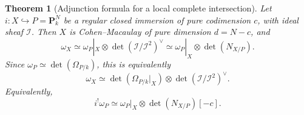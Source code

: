 \documentclass[11pt,a4paper]{article}
\newtheorem{theorem}{Theorem}[section]
\theoremstyle{definition}
\theoremstyle{remark}
\newcommand{\II}{\mathcal I}
\newcommand{\PP}{\mathbf P}
\newcommand{\dual}{^{\vee}}
\newcommand{\determinant}{\operatorname{det}}
\begin{document}
\begin{theorem}[Adjunction formula for a local complete intersection]
\label{thm:lci-adjunction}
Let $i:X\hookrightarrow P=\PP^N_k$ be a regular closed immersion of pure
codimension $c$, with ideal sheaf $\II$. Then $X$ is Cohen--Macaulay of pure
dimension $d=N-c$, and
\begin{equation}\label{eq:lci-adjunction}
  \omega_X
  \simeq
  \omega_P|_X\otimes
  \determinant(\II/\II^2)\dual
  \simeq\omega_P|_X\otimes\determinant(N_{X/P}).
\end{equation}
Since $\omega_P\simeq\determinant(\Omega_{P/k})$, this is equivalently
\begin{equation}\label{eq:lci-cotangent-conormal}
  \omega_X
  \simeq
  \determinant(\Omega_{P/k}|_X)
  \otimes\determinant(\II/\II^2)\dual.
\end{equation}
Equivalently,
\begin{equation}\label{eq:lci-shriek}
  i^!\omega_P
  \simeq
  \omega_P|_X\otimes\determinant(N_{X/P})[-c].
\end{equation}
\end{theorem}
\end{document}
